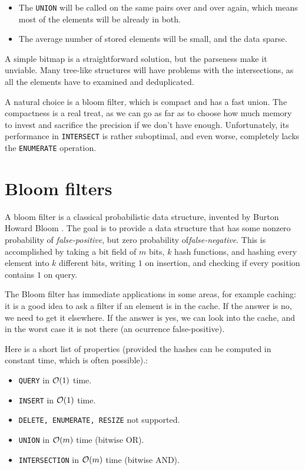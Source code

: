 \begin{itemize}
	\item The {\tt UNION} will be called on the same pairs over and over again,
		which means most of the elements will be already in both.
	\item The average number of stored elements will be small, and the data sparse.
\end{itemize}

A simple bitmap is a straightforward solution, but the parseness make it
unviable. Many tree-like structures will have problems with the intersections,
as all the elements have to examined and deduplicated.

A natural choice is a bloom filter, which is compact and has a fast union. The
compactness is a real treat, as we can go as far as to choose how much memory to
invest and sacrifice the precision if we don't have enough. Unfortunately, its
performance in {\tt INTERSECT} is rather suboptimal, and even worse, completely
lacks the {\tt ENUMERATE} operation.


\section{Bloom filters}

A bloom filter is a classical probabilistic data structure, invented by Burton
Howard Bloom \cite{Bloom1970}. The goal is to provide a data structure
that has some nonzero probability of {\it false-positive}, but zero probability
of{\it false-negative}. This is accomplished by taking a bit field of $m$ bits,
$k$ hash functions, and hashing every element into $k$ different bits, writing
$1$ on insertion, and checking if every position contains $1$ on query.

The Bloom filter has immediate applications in some areas, for example caching:
it is a good idea to ask a filter if an element is in the cache. If the answer is
no, we need to get it elsewhere. If the answer is yes, we can look into the
cache, and in the worst case it is not there (an ocurrence false-positive).

Here is a short list of properties (provided the hashes can be computed in
constant time, which is often possible).:

\begin{itemize}
	\item {\tt QUERY} in $\mathcal{O}(1)$ time.
	\item {\tt INSERT} in $\mathcal{O}(1)$ time.
	\item {\tt DELETE, ENUMERATE, RESIZE} not supported.
	\item {\tt UNION} in $\mathcal{O}(m)$ time (bitwise OR).
	\item {\tt INTERSECTION} in $\mathcal{O}(m)$ time (bitwise AND).
\end{itemize}

